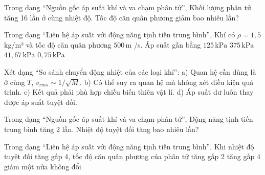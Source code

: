 \begin{ex}
Trong dạng “Nguồn gốc áp suất khí và va chạm phân tử”, Khối lượng phân tử tăng 16 lần ở cùng nhiệt độ. Tốc độ căn quân phương giảm bao nhiêu lần?
\end{ex}

\begin{ex}
Trong dạng “Liên hệ áp suất với động năng tịnh tiến trung bình”, Khí có $\rho=1,5$ kg/m³ và tốc độ căn quân phương $500\,\text{m}$ /s. Áp suất gần bằng
\choice
{\True $125\,\text{kPa}$}
{$375\,\text{kPa}$}
{$41,67\,\text{kPa}$}
{$0,75\,\text{kPa}$}
\end{ex}

\begin{ex}
Xét dạng “So sánh chuyển động nhiệt của các loại khí”: a) Quan hệ cần dùng là ở cùng $T$, $v_{rms}\sim1/\sqrt M$. b) Có thể suy ra quan hệ mà không xét điều kiện quá trình. c) Kết quả phải phù hợp chiều biến thiên vật lí. d) Áp suất dư luôn thay được áp suất tuyệt đối.
\choiceTF

\end{ex}

\begin{ex}
Trong dạng “Nguồn gốc áp suất khí và va chạm phân tử”, Động năng tịnh tiến trung bình tăng 2 lần. Nhiệt độ tuyệt đối tăng bao nhiêu lần?
\end{ex}

\begin{ex}
Trong dạng “Liên hệ áp suất với động năng tịnh tiến trung bình”, Khi nhiệt độ tuyệt đối tăng gấp 4, tốc độ căn quân phương của phân tử
\choice
{\True tăng gấp 2}
{tăng gấp 4}
{giảm một nửa}
{không đổi}
\end{ex}

